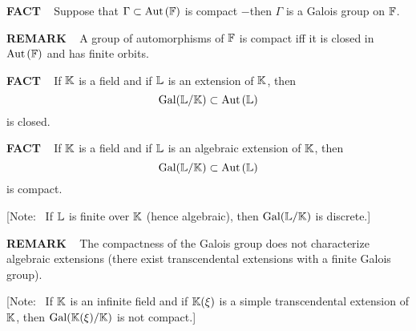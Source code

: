 \vspace{0.2cm}

\begin{x}{\small\bf FACT} \ %
Suppose that $\Gamma \subset \text{Aut}\hspace{0.05 cm}(\mathbb{F})$ is compact $-$then $\Gamma$ is a Galois group on $\mathbb{F}$.
\end{x}

\vspace{0.1cm}

\begin{x}{\small\bf REMARK} \ %
A group of automorphisms of $\mathbb{F}$ is compact iff it is closed in $\text{Aut}\hspace{0.05 cm}(\mathbb{F})$ and has finite orbits.
\end{x}

\vspace{0.1cm}

\begin{x}{\small\bf FACT} \ %
If $\mathbb{K}$ is a field and if $\mathbb{L}$ is an extension of $\mathbb{K}$, then 
\[
\text{Gal}(\mathbb{L} / \mathbb{K}) \subset \text{Aut}\hspace{0.05 cm}(\mathbb{L})
\]
is closed.
\end{x}


\begin{x}{\small\bf FACT} \ %
If $\mathbb{K}$ is a field and if $\mathbb{L}$ is an algebraic extension of $\mathbb{K}$, then 
\[
\text{Gal}(\mathbb{L} / \mathbb{K}) \subset \text{Aut}\hspace{0.05 cm}(\mathbb{L})
\]
is compact.

\vspace{0.1cm}

[Note: \ If $\mathbb{L}$ is finite over $\mathbb{K}$ (hence algebraic), then $\text{Gal}(\mathbb{L} / \mathbb{K})$ is discrete.]
\end{x}

\vspace{0.1cm}

\begin{x}{\small\bf REMARK} \ %
The compactness of the Galois group does not characterize algebraic extensions (there exist transcendental extensions with a finite Galois group).


\vspace{0.1cm}

[Note: \ If $\mathbb{K}$ is an infinite field and if $\mathbb{K}(\xi)$ is a simple transcendental extension of $\mathbb{K}$, then $\text{Gal}(\mathbb{K}(\xi) / \mathbb{K})$ is not compact.]
\end{x}

\vspace{0.1cm}


